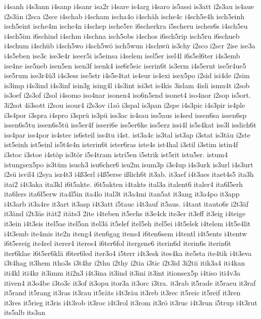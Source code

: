 {i4sanh
i4s3ann
i4sanp
i4sanr
isa2r
i4sare
is4arg
i4saro
is5assi
is3att
i2s3au
is4aue
i2s3än
i2sca
i2sce
i4schab
i4scham
ischa4o
i4schäh
ische4c
i4sch5e4h
isch5einh
isch5eint
ische4m
ische4n
i4schep
ische5re
i6scherkra
i5scheru
isches6s
i4sch5eu
i4sch5im
i6schind
i4schm
i4schna
isch5obs
i4schos
i6sch5rip
isch5ru
i6schueb
i4schum
i4schüb
i4sch5wo
i4sch5wö
isch5wun
i4schwü
is3chy
i2sco
i2scr
2ise
ise3a
i4s5eben
ise3c
ise3e4r
iseer5i
is5einsa
i4selem
isel5er
isel4l
i6s5el6ter
i4s3emb
ise4ne
ise5neb
isen5en
isen3f
isenk4
ise6r5eic
iserin6t
is3erm
i4s5ernt
ise5r4ue5
ise5rum
ise3r4ü3
i4s3ess
ise5str
i4s5e4tat
is4eur
is4exi
isex5po
i2sid
isi4de
i2sim
is3imp
i4s3ind
i4s3inf
isin3g
ising4l
i4s3int
isi3st
is4kis
3islam
4isli
ismu4t
i2sob
is3oef
i2s3of
i2sol
i4somo
iso4nar
isonen4
iso6n5end
isonet4
iso4nor
i2sop
is5ort.
3i2sot
4i3sott
i2sou
isour4
i2s3ov
i1sö
i3spal
is3pan
i2spe
i4s3pic
i4s3pir
is4ple
i3s4por
i3spra
i4spro
i3sprü
is3pü
iss3ac
is4sau
iss5aus
is4sed
issen6sa
issen6sp
issen6s5tu
issen6s5tü
iss5er4f
isseri6e
iss5er6ke
iss5erz
issi4l
is5s4kat
iss3l
isslich6t
iss4par
iss4por
is4stec
is6steil
iss4tu
i4st.
ist3a4c
is3tal
ist3ap
i3stat
is3täu
i2ste
ist5einh
ist5einl
is5t4e4n
isterin6t
ister6ras
iste4s
ist4hal
i3stil
i3stim
istin4f
i3stoc
i3stoe
i4stöp
is3tör
i5s4tram
istri5en
i5strik
ist5rit
istu5er.
istum4
istungsex5po
is3tüm
isuch3
isu6cher6
isu2m
isum3p
i3s4up
i4s3urk
is3url
i4s3urt
i2sü
isvil4
i2sya
isz4t3
i4ß3erl
i4ß5erse
ißlich6t
it3ab.
it3aef
i4t3aes
itaet4s5
ita3h
itai2
i4t3aka
ita3kl
i6t5akte.
i6t5akten
i4takts
ital3a
italent6
italer4
ita6l5erh
ita6lers
ita6l5erw
ita4l5in
ita4lo
ital3t
it3a4mi
itan5at
it3ang
it3a4po
it3app
i4t3arb
it3a4re
it3art
it3asp
i4t3att
i5tauc
i4t3auf
it5aus.
i4taut
itauto6r
i2t3äf
it3änd
i2t3äs
ität2
itäts3
2ite
i4teben
it5echs
it3e4ck
ite3er
it3eff
it3eig
i4teige
it3ein
i4t3eis
itel5ae
itel5an
itel3ä
it5elef
itel5eh
itel5ei
i4t5elek
i4telem
i4t5e4lit
i4t3emb
ite4mis
ite2n
iteng4
iten6gag
itens4
i6ten6sem
i4tentl
i4t5ents
i4tentw
i6t5ereig
ite4rel
iterer4
iteres4
i6ter6fol
itergene6
iterin6d
iterin6s
iterin6t
iter6klae
i6t5er6klä
i6ter6led
iter3o4
i5terr
i4t3esk
ites4ka
ite5sta
ite4tik
i4t3eva
i3t4hag
it3hem
itho3s
i3t4hr
i2thu
i2thy
i2tia
i3tic
i2t3id
3i2tii
itik3a4
iti4kan
iti4kl
iti4kr
it3imm
iti2n3
i4t3ina
it3ind
it3ini
it3int
itionsex5p
i4tiso
iti4v3a
itiven4
it3o4be
i3to3c
it3of
it3opu
itor3a
it3orc
i3tra.
it3rab
it5rade
it5raeu
it3raf
it5rand
it5rang
it3ras
it3rau
it5räts
i4t3räu
it3reb
it3rec
it5reic
it5reif
it3ren
it3res
it5rieg
it3ris
i4t3rob
it3roc
i4t3rol
it3rom
it3rö
it3ruc
i4t3run
i5trup
i4t3rut
its5alb
its3an
}
